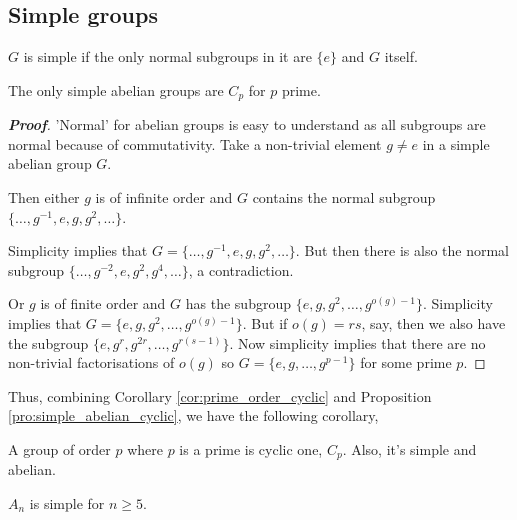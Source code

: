 \subsection{Simple groups}

\begin{definition}[Simplicity]
$G$ is simple if the only normal subgroups in it are $\{e\}$ and $G$ itself.
\end{definition}

\begin{proposition}\label{pro:simple_abelian_cyclic}
The only simple abelian groups are $C_p$ for $p$ prime.
\end{proposition}

\begin{proof}[\bf Proof]
'Normal' for abelian groups is easy to understand as all subgroups are normal because of commutativity. Take a non-trivial element $g \neq e$ in a simple abelian group $G$.

Then either $g$ is of infinite order and $G$ contains the normal subgroup $\{\dots, g^{-1}, e, g, g^2,\dots\}$.

Simplicity implies that $G = \{\dots, g^{-1}, e, g, g^2,\dots \}$. But then there is also the normal subgroup $\{\dots, g^{-2}, e, g^2, g^4,\dots \}$, a contradiction.

Or $g$ is of finite order and $G$ has the subgroup $\{e, g, g^2,\dots , g^{o(g)-1}\}$. Simplicity implies that $G = \{e, g, g^2,\dots , g^{o(g)-1}\}$. But if $o(g) = rs$, say, then we also have the subgroup $\{e, g^r, g^{2r},\dots , g^{r(s-1)}\}$. Now simplicity implies that there are no non-trivial factorisations of $o(g)$ so $G = \{e, g,\dots , g^{p-1}\}$ for some prime $p$.
\end{proof}

Thus, combining Corollary \ref{cor:prime_order_cyclic} and Proposition \ref{pro:simple_abelian_cyclic}, we have the following corollary,

\begin{corollary}\label{cor:prime_cyclic_simple_abelian}
A group of order $p$ where $p$ is a prime is cyclic one, $C_p$. Also, it's simple and abelian.
\end{corollary}

\begin{theorem}\label{thm:a_n_is_simple_n_geq_5}
$A_n$ is simple for $n \geq 5$.
\end{theorem}

